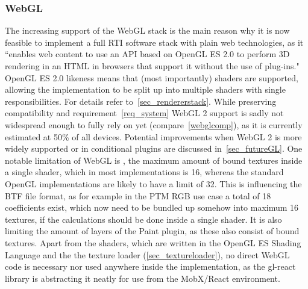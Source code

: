 \subsubsection*{WebGL}
The increasing support of the WebGL stack is the main reason why
  it is now feasible to implement a full RTI software stack with plain web
  technologies, as it ``enables web content to use an API based on OpenGL ES 2.0
  to perform 3D rendering in an HTML  in browsers that support it
  without the use of plug-ins."\cite*{noauthor_webgl_nodate-1} OpenGL ES 2.0
  likeness means that (most importantly) shaders are supported, allowing the
  implementation to be split up into multiple shaders with single
  responsibilities. For details refer to~\autoref{sec_rendererstack}. While preserving compatibility and
  requirement~\ref{req_system} WebGL 2 support is sadly not widespread enough to fully rely on yet
  (compare~\autoref{webglcomp}), as it is currently estimated at 50\% of all devices\cite*{noauthor_webgl_nodate-2}.
    Potential improvements
  when WebGL 2 is more widely supported or in conditional plugins are discussed
  in~\autoref{sec_futureGL}. One notable limitation of WebGL is
  , the maximum amount of bound textures inside a
  single shader, which in most implementations is
  16\cite*{noauthor_webgl_nodate-3}, whereas the standard OpenGL implementations
  are likely to have a limit of 32. This is influencing the BTF file format, as
  for example in the PTM RGB use case a total of 18 coefficients exist, which
  now need to be bundled up somehow into maximum 16 textures, if the
  calculations should be done inside a single shader. It is also limiting the
  amount of layers of the Paint plugin, as these also consist of bound textures.
  Apart from the shaders, which are written in the OpenGL ES
  Shading Language\cite*{noauthor_webgl_nodate-4} and the the texture loader (\autoref{sec_textureloader}), no direct
  WebGL code is necessary nor used anywhere inside the implementation, as the
  gl-react library is abstracting it neatly for use from the MobX/React environment.

